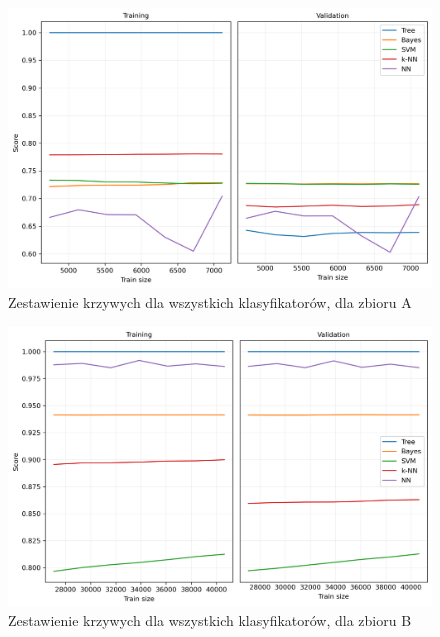 \documentclass[a4paper,11pt]{article}
\begin{document}
\begin{figure}[H]
    \centering
    \includegraphics[width=\textwidth]{images3/learning_curves/learning_curve_Rankeds.png}
    \caption{Zestawienie krzywych dla wszystkich klasyfikatorów, dla zbioru A}
    \label{fig:learning_curve_a}
\end{figure}

\begin{figure}[H]
    \centering
    \includegraphics[width=\textwidth]{images3/learning_curves/learning_curve_Rain.png}
    \caption{Zestawienie krzywych dla wszystkich klasyfikatorów, dla zbioru B}
    \label{fig:learning_curve_b}
\end{figure}
\end{document}
